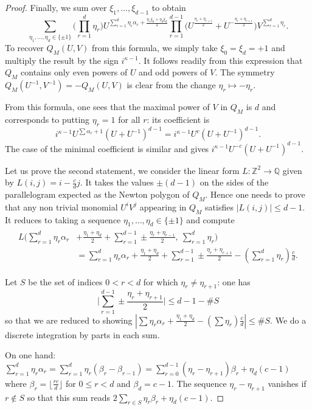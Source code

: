 \documentclass[10pt,a4paper]{amsart}
\newcommand{\Q}{\mathbb{Q}}
\newcommand{\Z}{\mathbb{Z}}
\begin{document}
\begin{proof}
Finally, we sum over $\xi_1,\ldots,\xi_{d-1}$ to obtain
\begin{equation}\label{PolQ}
\sum_{\eta_1,\ldots,\eta_d\in\{\pm1\}}\Big(\prod_{r=1}^d\eta_r\Big) U^{\sum_{r=1}^d \eta_r \alpha_r+\frac{\eta_1\xi_{0}+\eta_d\xi_d}{2}}\prod_{r=1}^{d-1}\Big(U^{\frac{\eta_r+\eta_{r+1}}{2}}+U^{-\frac{\eta_r+\eta_{r+1}}{2}}\Big)V^{\sum_{r=1}^d \eta_r}.
\end{equation}
To recover $Q_M(U,V)$ from this formula, we simply take $\xi_0=\xi_d=+1$ and multiply the result by the sign $i^{\kappa-1}$. It follows readily from this expression that $Q_M$ contains only even powers of $U$ and odd powers of $V$. The symmetry $Q_M(U^{-1},V^{-1})=-Q_M(U,V)$ is clear from the change $\eta_r\mapsto -\eta_r$. 

From this formula, one sees that the maximal power of $V$ in $Q_M$ is $d$ and corresponds to putting $\eta_r=1$ for all $r$: its coefficient is 
$$i^{\kappa-1} U^{\sum \alpha_r+1}(U+U^{-1})^{d-1}=i^{\kappa-1} U^{c}(U+U^{-1})^{d-1}.$$
The case of the minimal coefficient is similar and gives $i^{\kappa-1}U^{-c}(U+U^{-1})^{d-1}$.

Let us prove the second statement, we consider the linear form $L:\Z^2\to\Q$ given by $L(i,j)=i-\frac{c}{d}j$. It takes the values $\pm (d-1)$ on the sides of the parallelogram expected as the Newton polygon of $Q_M$. Hence one needs to prove that any non trivial monomial $U^iV^j$ appearing in $Q_M$ satisfies $|L(i,j)|\le d-1$. It reduces to taking a sequence $\eta_1,\ldots,\eta_d\in \{\pm 1\}$ and compute 
\begin{align*}
\begin{split}
L \Big(\sum_{r=1}^d \eta_r \alpha_r&+\frac{\eta_1+\eta_d}{2}+\sum_{r=1}^{d-1}\pm\frac{\eta_r+\eta_{r-1}}{2},\ \sum_{r=1}^d \eta_r\Big)\\
&=\sum_{r=1}^{d}\eta_r\alpha_r+\frac{\eta_1+\eta_d}{2}+\sum_{r=1}^{d-1} \pm \frac{\eta_r+\eta_{r+1}}{2}-(\sum_{r=1}^d \eta_r)\frac{c}{d}.
\end{split}
\end{align*}

Let $S$ be the set of indices $0< r<d$ for which $\eta_r\ne \eta_{r+1}$: one has 
$$\Big|\sum_{r=1}^{d-1} \pm \frac{\eta_r+\eta_{r+1}}{2}\Big|\le d-1-\#S$$
so that we are reduced to showing $|\sum \eta_r\alpha_r+\frac{\eta_1+\eta_d}{2}-(\sum\eta_r)\frac{c}{d}|\le \#S$. We do a discrete integration by parts in each sum.

On one hand: $\sum_{r=1}^d\eta_r\alpha_r=\sum_{r=1}^d\eta_r(\beta_r-\beta_{r-1})=\sum_{r=0}^{d-1}(\eta_r-\eta_{r+1})\beta_r+\eta_d(c-1)$ where $\beta_r=\lfloor \frac{rc}{d}\rfloor$ for $0\le r<d$ and $\beta_d=c-1$. 
The sequence $\eta_r-\eta_{r+1}$ vanishes if $r\notin S$ so that this sum reads $2\sum_{r\in S}\eta_r\beta_r+\eta_d(c-1)$.


\end{proof}
\end{document}
